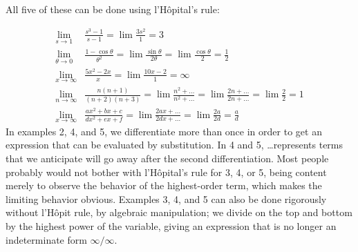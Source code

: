 All five of these can be done using l'H\^{o}pital's rule:

\begin{align*}
  \lim_{s\rightarrow 1} & \frac{s^3-1}{s-1} = \lim \frac{3s^2}{1} = 3 \\
  \lim_{\theta\rightarrow 0} & \frac{1-\cos\theta}{\theta^2} = \lim \frac{\sin\theta}{2\theta} = \lim \frac{\cos\theta}{2} = \frac{1}{2} \\
  \lim_{x\rightarrow \infty} & \frac{5x^2-2x}{x} = \lim \frac{10x-2}{1} = \infty \\
  \lim_{n\rightarrow \infty} & \frac{n(n+1)}{(n+2)(n+3)} = \lim \frac{n^2+\ldots}{n^2+\ldots}  = \lim \frac{2n+\ldots}{2n+\ldots} = \lim \frac{2}{2} = 1 \\
  \lim_{x\rightarrow \infty} & \frac{ax^2+bx+c}{dx^2+ex+f} = \lim \frac{2ax+\ldots}{2dx+\ldots} = \lim \frac{2a}{2d} = \frac{a}{d}
\end{align*}
In examples 2, 4, and 5, we differentiate more than once in order to get an expression that can be evaluated by
substitution. In 4 and 5, \ldots represents terms that we anticipate will go away after the second differentiation.
Most people probably would not bother with l'H\^{o}pital's rule for 3, 4, or 5, being content merely to observe
the behavior of the highest-order term, which makes the limiting behavior obvious. Examples 3, 4, and 5 can also
be done rigorously without l'H\^{o}pit rule, by algebraic manipulation;
we divide on the top and bottom by the highest power of the variable, giving an expression that is no longer
an indeterminate form $\infty/\infty$.
